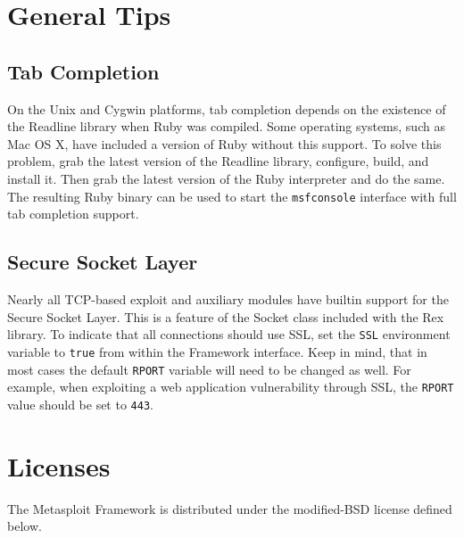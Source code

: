 \documentclass{report}
\begin{document}
\pagebreak
\chapter{General Tips}

	\section{Tab Completion}
	\label{REF-TAB}
\par
On the Unix and Cygwin platforms, tab completion depends on the existence of the Readline 
library when Ruby was compiled. Some operating systems, such as Mac OS X, have included
a version of Ruby without this support. To solve this problem, grab the latest version
of the Readline library, configure, build, and install it. Then grab the latest version
of the Ruby interpreter and do the same. The resulting Ruby binary can be used to start the
\texttt{msfconsole} interface with full tab completion support.


	\section{Secure Socket Layer}
	\label{REF-SSL}
\par
Nearly all TCP-based exploit and auxiliary modules have builtin support for the Secure Socket Layer.
This is a feature of the Socket class included with the Rex library. To indicate that all connections
should use SSL, set the \texttt{SSL} environment variable to \texttt{true} from within the Framework
interface. Keep in mind, that in most cases the default \texttt{RPORT} variable will need to be 
changed as well. For example, when exploiting a web application vulnerability through SSL, the
\texttt{RPORT} value should be set to \texttt{443}.

\pagebreak
\chapter{Licenses}

\par
The Metasploit Framework is distributed under the modified-BSD license defined below.
\end{document}
